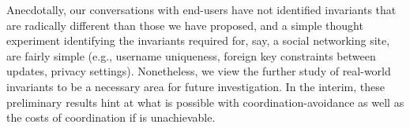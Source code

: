 Anecdotally, our conversations with end-users have not identified
invariants that are radically different than those we have proposed,
and a simple thought experiment identifying the invariants required
for, say, a social networking site, are fairly simple (e.g., username
uniqueness, foreign key constraints between updates, privacy
settings). Nonetheless, we view the further study of real-world
invariants to be a necessary area for future investigation. In the
interim, these preliminary results hint at what is possible with
coordination-avoidance as well as the costs of coordination if
\cfreedom is unachievable.


